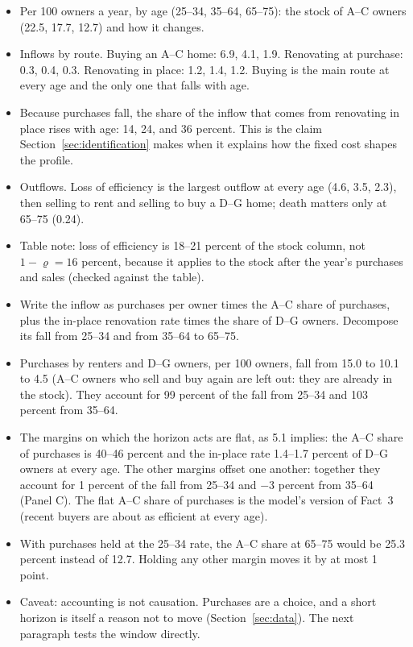 \begin{itemize}
  \item Per 100 owners a year, by age (25--34, 35--64, 65--75): the stock
    of A--C owners (22.5, 17.7, 12.7) and how it changes.
  \item Inflows by route. Buying an A--C home: 6.9, 4.1, 1.9. Renovating at
    purchase: 0.3, 0.4, 0.3. Renovating in place: 1.2, 1.4, 1.2. Buying is
    the main route at every age and the only one that falls with age.
  \item Because purchases fall, the share of the inflow that comes from
    renovating in place rises with age: 14, 24, and 36 percent. This is the
    claim Section~\ref{sec:identification} makes when it explains how the
    fixed cost shapes the profile.
  \item Outflows. Loss of efficiency is the largest outflow at every age
    (4.6, 3.5, 2.3), then selling to rent and selling to buy a D--G home;
    death matters only at 65--75 (0.24).
  \item Table note: loss of efficiency is 18--21 percent of the stock
    column, not $1-\varrho=16$ percent, because it applies to the stock
    after the year's purchases and sales (checked against the table).
\end{itemize}

\begin{itemize}
  \item Write the inflow as purchases per owner times the A--C share of
    purchases, plus the in-place renovation rate times the share of D--G
    owners. Decompose its fall from 25--34 and from 35--64 to 65--75.
  \item Purchases by renters and D--G owners, per 100 owners, fall from
    15.0 to 10.1 to 4.5 (A--C owners who sell and buy again are left out:
    they are already in the stock). They account for 99 percent of the
    fall from 25--34 and 103 percent from 35--64.
  \item The margins on which the horizon acts are flat, as 5.1 implies:
    the A--C share of purchases is 40--46 percent and the in-place rate
    1.4--1.7 percent of D--G owners at every age. The other margins offset
    one another: together they account for 1 percent of the fall from
    25--34 and $-3$ percent from 35--64 (Panel C). The flat A--C share of
    purchases is the model's version of Fact~3 (recent buyers are about as
    efficient at every age).
  \item With purchases held at the 25--34 rate, the A--C share at 65--75
    would be 25.3 percent instead of 12.7. Holding any other margin moves
    it by at most 1 point.
  \item Caveat: accounting is not causation. Purchases are a choice, and a
    short horizon is itself a reason not to move
    (Section~\ref{sec:data}). The next paragraph tests the window directly.
\end{itemize}

